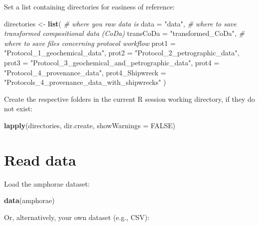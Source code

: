 \documentclass[12pt,]{book}
\newenvironment{Shaded}{\begin{snugshade}}{\end{snugshade}}
\newcommand{\CommentTok}[1]{\textcolor[rgb]{0.56,0.35,0.01}{\textit{#1}}}
\newcommand{\DataTypeTok}[1]{\textcolor[rgb]{0.13,0.29,0.53}{#1}}
\newcommand{\KeywordTok}[1]{\textcolor[rgb]{0.13,0.29,0.53}{\textbf{#1}}}
\newcommand{\NormalTok}[1]{#1}
\newcommand{\OtherTok}[1]{\textcolor[rgb]{0.56,0.35,0.01}{#1}}
\newcommand{\StringTok}[1]{\textcolor[rgb]{0.31,0.60,0.02}{#1}}
\begin{document}
Set a list containing directories for easiness of reference:

\begin{Shaded}
\begin{Highlighting}[]
\NormalTok{directories <-}\StringTok{ }\KeywordTok{list}\NormalTok{(}
  \CommentTok{# where you raw data is}
  \DataTypeTok{data =} \StringTok{"data"}\NormalTok{, }
  \CommentTok{# where to save transformed compositional data (CoDa)}
  \DataTypeTok{transCoDa =} \StringTok{"transformed_CoDa"}\NormalTok{, }
  \CommentTok{# where to save files concerning protocol workflow}
  \DataTypeTok{prot1 =} \StringTok{"Protocol_1_geochemical_data"}\NormalTok{,}
  \DataTypeTok{prot2 =} \StringTok{"Protocol_2_petrographic_data"}\NormalTok{,}
  \DataTypeTok{prot3 =} \StringTok{"Protocol_3_geochemical_and_petrographic_data"}\NormalTok{,}
  \DataTypeTok{prot4 =} \StringTok{"Protocol_4_provenance_data"}\NormalTok{,}
  \DataTypeTok{prot4_Shipwreck =} \StringTok{"Protocols_4_provenance_data_with_shipwrecks"}
\NormalTok{)}
\end{Highlighting}
\end{Shaded}

Create the respective folders in the current R session working directory, if they do not exist:

\begin{Shaded}
\begin{Highlighting}[]
\KeywordTok{lapply}\NormalTok{(directories, dir.create, }\DataTypeTok{showWarnings =} \OtherTok{FALSE}\NormalTok{)}
\end{Highlighting}
\end{Shaded}

\hypertarget{read-data}{%
\section{Read data}\label{read-data}}

Load the amphorae dataset:

\begin{Shaded}
\begin{Highlighting}[]
\KeywordTok{data}\NormalTok{(amphorae)}
\end{Highlighting}
\end{Shaded}

Or, alternatively, your own dataset (e.g., CSV):
\end{document}

